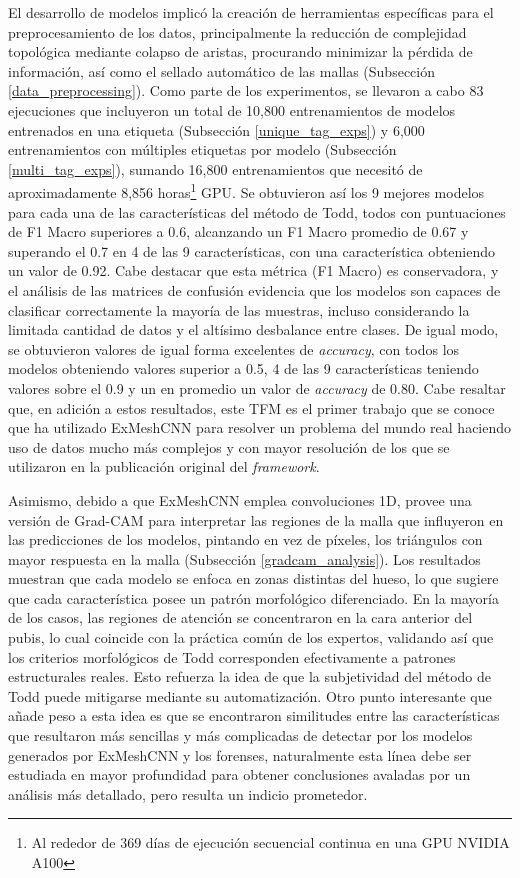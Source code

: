 El desarrollo de modelos implicó la creación de herramientas específicas para el preprocesamiento de los datos, principalmente la reducción de complejidad topológica mediante colapso de aristas, procurando minimizar la pérdida de información, así como el sellado automático de las mallas (Subsección \ref{data_preprocessing}). Como parte de los experimentos, se llevaron a cabo 83 ejecuciones que incluyeron un total de 10,800 entrenamientos de modelos entrenados en una etiqueta (Subsección \ref{unique_tag_exps}) y 6,000 entrenamientos con múltiples etiquetas por modelo (Subsección \ref{multi_tag_exps}), sumando 16,800 entrenamientos que necesitó de aproximadamente 8,856 horas\footnote{Al rededor de 369 días de ejecución secuencial continua en una GPU NVIDIA A100} GPU\cite{englewood_understanding_2025}. Se obtuvieron así los 9 mejores modelos para cada una de las características del método de Todd, todos con puntuaciones de F1 Macro superiores a 0.6, alcanzando un F1 Macro promedio de 0.67 y superando el 0.7 en 4 de las 9 características, con una característica obteniendo un valor de 0.92. Cabe destacar que esta métrica (F1 Macro) es conservadora, y el análisis de las matrices de confusión evidencia que los modelos son capaces de clasificar correctamente la mayoría de las muestras, incluso considerando la limitada cantidad de datos y el altísimo desbalance entre clases. De igual modo, se obtuvieron valores de igual forma excelentes de \textit{accuracy}, con todos los modelos obteniendo valores superior a 0.5, 4 de las 9 características teniendo valores sobre el 0.9 y un en promedio un valor de \textit{accuracy} de 0.80. Cabe resaltar que, en adición a estos resultados, este TFM es el primer trabajo que se conoce que ha utilizado ExMeshCNN para resolver un problema del mundo real haciendo uso de datos mucho más complejos y con mayor resolución de los que se utilizaron en la publicación original del \textit{framework}.

Asimismo, debido a que ExMeshCNN emplea convoluciones 1D, provee una versión de Grad-CAM para interpretar las regiones de la malla que influyeron en las predicciones de los modelos, pintando en vez de píxeles, los triángulos con mayor respuesta en la malla (Subsección \ref{gradcam_analysis}). Los resultados muestran que cada modelo se enfoca en zonas distintas del hueso, lo que sugiere que cada característica posee un patrón morfológico diferenciado. En la mayoría de los casos, las regiones de atención se concentraron en la cara anterior del pubis, lo cual coincide con la práctica común de los expertos, validando así que los criterios morfológicos de Todd corresponden efectivamente a patrones estructurales reales. Esto refuerza la idea de que la subjetividad del método de Todd puede mitigarse mediante su automatización. Otro punto interesante que añade peso a esta idea es que se encontraron similitudes entre las características que resultaron más sencillas y más complicadas de detectar por los modelos generados por ExMeshCNN y los forenses, naturalmente esta línea debe ser estudiada en mayor profundidad para obtener conclusiones avaladas por un análisis más detallado, pero resulta un indicio prometedor.

